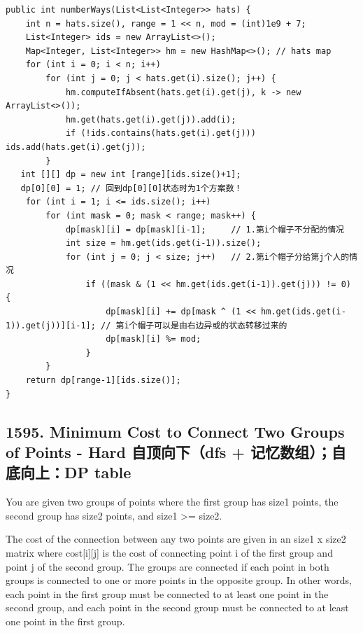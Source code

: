 \documentclass[9pt, b5paper]{article}
\begin{document}
\begin{verbatim}
public int numberWays(List<List<Integer>> hats) {
    int n = hats.size(), range = 1 << n, mod = (int)1e9 + 7;
    List<Integer> ids = new ArrayList<>();
    Map<Integer, List<Integer>> hm = new HashMap<>(); // hats map
    for (int i = 0; i < n; i++) 
        for (int j = 0; j < hats.get(i).size(); j++) {
            hm.computeIfAbsent(hats.get(i).get(j), k -> new ArrayList<>());
            hm.get(hats.get(i).get(j)).add(i);
            if (!ids.contains(hats.get(i).get(j))) ids.add(hats.get(i).get(j));
        }
   int [][] dp = new int [range][ids.size()+1];
   dp[0][0] = 1; // 回到dp[0][0]状态时为1个方案数！
    for (int i = 1; i <= ids.size(); i++) 
        for (int mask = 0; mask < range; mask++) {
            dp[mask][i] = dp[mask][i-1];     // 1.第i个帽子不分配的情况
            int size = hm.get(ids.get(i-1)).size();
            for (int j = 0; j < size; j++)   // 2.第i个帽子分给第j个人的情况
                if ((mask & (1 << hm.get(ids.get(i-1)).get(j))) != 0) {
                    dp[mask][i] += dp[mask ^ (1 << hm.get(ids.get(i-1)).get(j))][i-1]; // 第i个帽子可以是由右边异或的状态转移过来的
                    dp[mask][i] %= mod;
                }
        }
    return dp[range-1][ids.size()];
}
\end{verbatim}
\subsection{1595. Minimum Cost to Connect Two Groups of Points - Hard 自顶向下（dfs + 记忆数组）；自底向上：DP table}
\label{sec-3-11}
You are given two groups of points where the first group has size1 points, the second group has size2 points, and size1 >= size2.

The cost of the connection between any two points are given in an size1 x size2 matrix where cost[i][j] is the cost of connecting point i of the first group and point j of the second group. The groups are connected if each point in both groups is connected to one or more points in the opposite group. In other words, each point in the first group must be connected to at least one point in the second group, and each point in the second group must be connected to at least one point in the first group.
\end{document}
